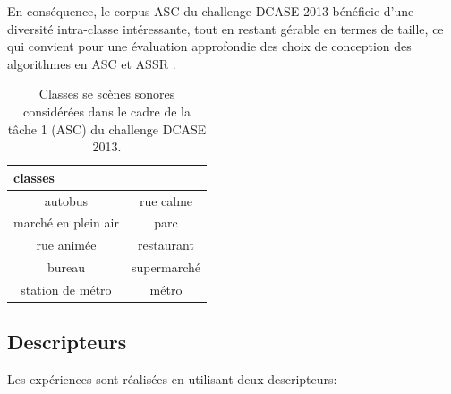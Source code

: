 En conséquence, le corpus ASC du challenge DCASE 2013 bénéficie d'une diversité intra-classe intéressante, tout en restant gérable en termes de taille, ce qui convient pour une évaluation approfondie des choix de conception des algorithmes en ASC et ASSR \citep{lagrange2015bag}.

\begin{table}[t]
\centering
\begin{tabular}{cc}
\multicolumn{2}{l}{classes} \\
\hline 
autobus             & rue calme \\ 
marché en plein air & parc            \\                      
rue animée          & restaurant \\ 
bureau              & supermarché \\ 
station de métro    & métro \\ 
\hline
\end{tabular}
\vspace{0.5mm}
\caption{Classes se scènes sonores considérées dans le cadre de la tâche 1 (ASC) du challenge DCASE 2013.}
\label{tab:classASCDcase2013}
\end{table}

\subsection{Descripteurs}

Les expériences sont réalisées en utilisant deux descripteurs:

